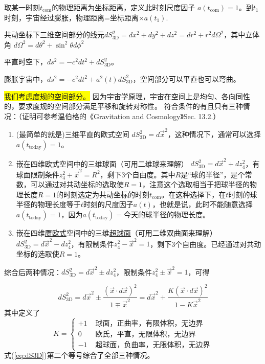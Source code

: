 \documentclass[12pt]{ctexart}
\begin{document}
取某一时刻$t_\text{com}$的物理距离为坐标距离，定义此时刻尺度因子
\newline $a(t_\text{com})=1$。到$t_1$时刻，宇宙经过膨胀，物理距离=坐标距离$\times a(t_1)$.

共动坐标下三维空间部分的线元$dS_\text{3D}^2 = dx^2+dy^2+dz^2=dr^2+r^2 d\Omega^2$，其中立体角 $d\Omega^2 = d\theta^2 + \sin^2\theta d\phi^2$ 

平直时空下，$ds^2=-c^2dt^2 + dS_\text{3D}^2$。

膨胀宇宙中，$ds^2=-c^2dt^2 + a^2(t) dS_\text{3D}^2$，空间部分可以平直也可以弯曲。

\colorbox{yellow}{我们考虑度规的空间部分。}
因为宇宙学原理，宇宙在空间上是均匀、各向同性的，要求度规的空间部分满足平移和旋转对称性。
符合条件的有且只有三种情况：（证明可参考温伯格的《Gravitation and Cosmology》Sec. 13.2.）
\begin{enumerate}
    \item (最简单的就是)三维平直的欧式空间 $dS_\text{3D}^2 = d\vec{x}^2$，这种情况下，通常可以选择$a(t_\text{today})=1$。
    \item 嵌在四维欧式空间中的三维球面（可用二维球来理解） $dS_\text{3D}^2 = d\vec{x}^2 + dz_4^2$，有球面限制条件$z_4^2 + \vec{x}^2 = R^2$，剩下3个自由度。其中$R$是“球的半径”，是个常数，可以通过对共动坐标的选取使$R=1$，注意这个选取相当于把球半径的物理长度$R=1$的时刻选定为共动坐标的时刻$t_\text{com}$。在这种选择下，在$t$时刻的球半径的物理长度等于$t$时刻的尺度因子$a(t)$，也就是说，此时不能随意选择$a(t_\text{today})=1$，因为$a(t_\text{today})=$今天的球半径的物理长度。
    \item 嵌在四维\underline{赝欧式}空间中的三维\underline{超球面}（可用二维双曲面来理解） \\ $dS_\text{3D}^2 = d\vec{x}^2 - dz_4^2$，有限制条件$z_4^2 - \vec{x}^2 = 1$，剩下3个自由度。已经通过对共动坐标的选取使$R=1$。
\end{enumerate}

综合后两种情况：$dS_\text{3D}^2 = d\vec{x}^2 \pm dz_4^2$，限制条件$z_4^2 \pm \vec{x}^2 = 1$，可得

\begin{equation} \label{eq:dS3D}
    dS_\text{3D}^2 = d\vec{x}^2 \pm \frac{(\vec{x} \cdot d\vec{x})^2}{1\mp \vec{x}^2} = d\vec{x}^2 +  \frac{K(\vec{x} \cdot d\vec{x})^2}{1-K \vec{x}^2}
\end{equation}
其中定义了
\begin{equation}
    K= \begin{cases}+1 & \text { 球面，正曲率，有限体积，无边界} \\ 0 & \text { 欧氏，平直，无限体积，无边界 } \\ -1 & \text { 超球面，负曲率，无限体积，无边界} \end{cases}
\end{equation}
式(\ref{eq:dS3D})第二个等号综合了全部三种情况。
\end{document}
